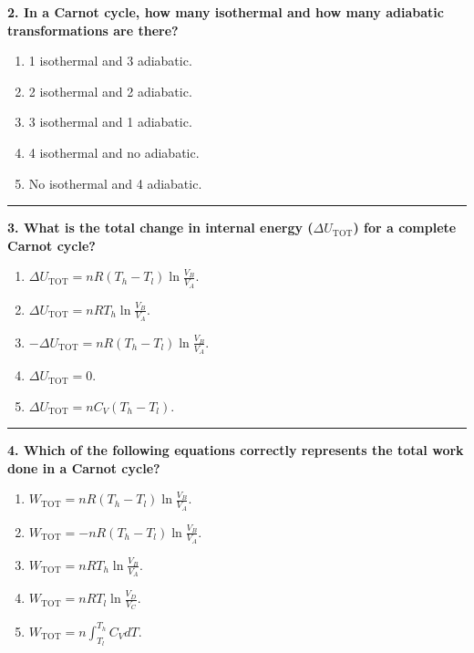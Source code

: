 \documentclass[
  9pt,
]{extbook}
\providecommand{\tightlist}{%
  \setlength{\itemsep}{0pt}\setlength{\parskip}{0pt}}
\theoremstyle{definition}
\theoremstyle{definition}
\theoremstyle{definition}
\theoremstyle{definition}
\theoremstyle{remark}
\begin{document}
\textbf{2. In a Carnot cycle, how many isothermal and how many adiabatic transformations are there?}

\begin{enumerate}
\def\labelenumi{\alph{enumi}.}
\tightlist
\item
  1 isothermal and 3 adiabatic.
\item
  2 isothermal and 2 adiabatic.
\item
  3 isothermal and 1 adiabatic.
\item
  4 isothermal and no adiabatic.
\item
  No isothermal and 4 adiabatic.
\end{enumerate}

\begin{center}\rule{0.5\linewidth}{0.5pt}\end{center}

\textbf{3. What is the total change in internal energy (\(\Delta U_{\text{TOT}}\)) for a complete Carnot cycle?}

\begin{enumerate}
\def\labelenumi{\alph{enumi}.}
\tightlist
\item
  \(\Delta U_{\text{TOT}}=nR(T_h - T_l)\ln\frac{V_B}{V_A}\).
\item
  \(\Delta U_{\text{TOT}}=nRT_h\ln\frac{V_B}{V_A}\).
\item
  \(-\Delta U_{\text{TOT}}=nR(T_h - T_l)\ln\frac{V_B}{V_A}\).
\item
  \(\Delta U_{\text{TOT}}=0\).
\item
  \(\Delta U_{\text{TOT}}=nC_V(T_h - T_l)\).
\end{enumerate}

\begin{center}\rule{0.5\linewidth}{0.5pt}\end{center}

\textbf{4. Which of the following equations correctly represents the total work done in a Carnot cycle?}

\begin{enumerate}
\def\labelenumi{\alph{enumi}.}
\tightlist
\item
  \(W_{\text{TOT}} = nR(T_h - T_l)\ln\frac{V_B}{V_A}\).
\item
  \(W_{\text{TOT}} = -nR(T_h - T_l)\ln\frac{V_B}{V_A}\).
\item
  \(W_{\text{TOT}} = nRT_h\ln\frac{V_B}{V_A}\).
\item
  \(W_{\text{TOT}} = nRT_l\ln\frac{V_D}{V_C}\).
\item
  \(W_{\text{TOT}} = n\int_{T_l}^{T_h}C_V dT\).
\end{enumerate}
\end{document}
